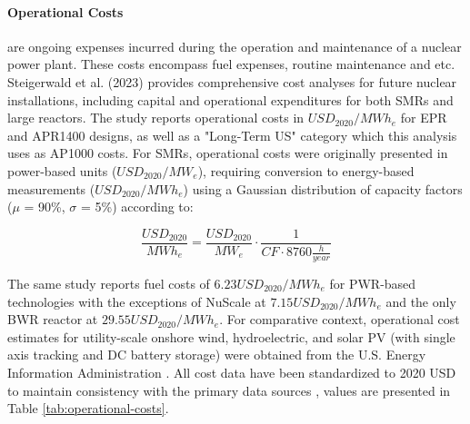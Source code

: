 \paragraph{Operational Costs} are ongoing expenses incurred during the operation and maintenance of a nuclear power plant. These costs encompass fuel expenses, routine maintenance and etc. Steigerwald et al. (2023) \cite{STEIGERWALD2023128204} provides comprehensive cost analyses for future nuclear installations, including capital and operational expenditures for both SMRs and large reactors. The study reports operational costs in $USD_{2020}/MWh_e$ for EPR and APR1400 designs, as well as a "Long-Term US" category which this analysis uses as AP1000 costs. For SMRs, operational costs were originally presented in power-based units ($USD_{2020}/MW_e$), requiring conversion to energy-based measurements ($USD_{2020}/MWh_e$) using a Gaussian distribution of capacity factors ($\mu$ = 90\%, $\sigma$ = 5\%) according to:

$$
\frac{USD_{2020}}{MWh_e} = \frac{USD_{2020}}{MW_e} \cdot \frac{1}{CF \cdot 8760 \frac{h}{year}}
$$

The same study reports fuel costs of $6.23 USD_{2020}/MWh_e$ for PWR-based technologies with the exceptions of NuScale at $7.15 USD_{2020}/MWh_e$ and the only BWR reactor at $29.55 USD_{2020}/MWh_e$. For comparative context, operational cost estimates for utility-scale onshore wind, hydroelectric, and solar PV (with single axis tracking and DC battery storage) were obtained from the U.S. Energy Information Administration \cite{EIA_Capital_Costs_AEO2024}. All cost data have been standardized to 2020 USD to maintain consistency with the primary data sources \cite{STEIGERWALD2023128204, NEA2020}, values are presented in Table \ref{tab:operational-costs}.

